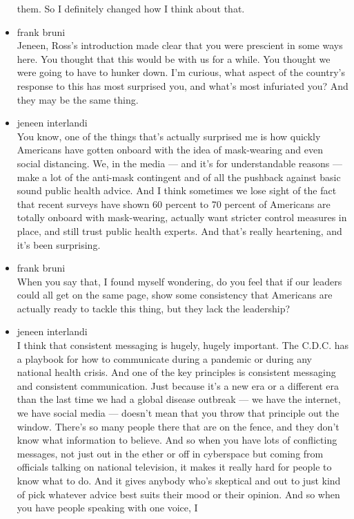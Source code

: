 \begin{itemize}
  them. So I definitely changed how I think about that.
\item
  frank bruni\\
  Jeneen, Ross's introduction made clear that you were prescient in some
  ways here. You thought that this would be with us for a while. You
  thought we were going to have to hunker down. I'm curious, what aspect
  of the country's response to this has most surprised you, and what's
  most infuriated you? And they may be the same thing.
\item
  jeneen interlandi\\
  You know, one of the things that's actually surprised me is how
  quickly Americans have gotten onboard with the idea of mask-wearing
  and even social distancing. We, in the media --- and it's for
  understandable reasons --- make a lot of the anti-mask contingent and
  of all the pushback against basic sound public health advice. And I
  think sometimes we lose sight of the fact that recent surveys have
  shown 60 percent to 70 percent of Americans are totally onboard with
  mask-wearing, actually want stricter control measures in place, and
  still trust public health experts. And that's really heartening, and
  it's been surprising.
\item
  frank bruni\\
  When you say that, I found myself wondering, do you feel that if our
  leaders could all get on the same page, show some consistency that
  Americans are actually ready to tackle this thing, but they lack the
  leadership?
\item
  jeneen interlandi\\
  I think that consistent messaging is hugely, hugely important. The
  C.D.C. has a playbook for how to communicate during a pandemic or
  during any national health crisis. And one of the key principles is
  consistent messaging and consistent communication. Just because it's a
  new era or a different era than the last time we had a global disease
  outbreak --- we have the internet, we have social media --- doesn't
  mean that you throw that principle out the window. There's so many
  people there that are on the fence, and they don't know what
  information to believe. And so when you have lots of conflicting
  messages, not just out in the ether or off in cyberspace but coming
  from officials talking on national television, it makes it really hard
  for people to know what to do. And it gives anybody who's skeptical
  and out to just kind of pick whatever advice best suits their mood or
  their opinion. And so when you have people speaking with one voice, I

\end{itemize}
